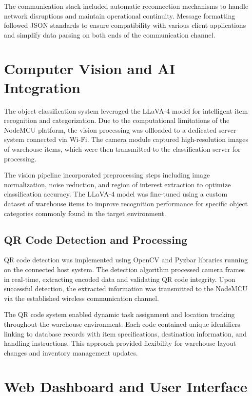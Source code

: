 The communication stack included automatic reconnection mechanisms to handle network disruptions and maintain operational continuity. Message formatting followed JSON standards to ensure compatibility with various client applications and simplify data parsing on both ends of the communication channel.

\section{Computer Vision and AI Integration}

The object classification system leveraged the LLaVA-4 model for intelligent item recognition and categorization. Due to the computational limitations of the NodeMCU platform, the vision processing was offloaded to a dedicated server system connected via Wi-Fi. The camera module captured high-resolution images of warehouse items, which were then transmitted to the classification server for processing.

The vision pipeline incorporated preprocessing steps including image normalization, noise reduction, and region of interest extraction to optimize classification accuracy. The LLaVA-4 model was fine-tuned using a custom dataset of warehouse items to improve recognition performance for specific object categories commonly found in the target environment.

\subsection{QR Code Detection and Processing}

QR code detection was implemented using OpenCV and Pyzbar libraries running on the connected host system. The detection algorithm processed camera frames in real-time, extracting encoded data and validating QR code integrity. Upon successful detection, the extracted information was transmitted to the NodeMCU via the established wireless communication channel.

The QR code system enabled dynamic task assignment and location tracking throughout the warehouse environment. Each code contained unique identifiers linking to database records with item specifications, destination information, and handling instructions. This approach provided flexibility for warehouse layout changes and inventory management updates.

\section{Web Dashboard and User Interface}

